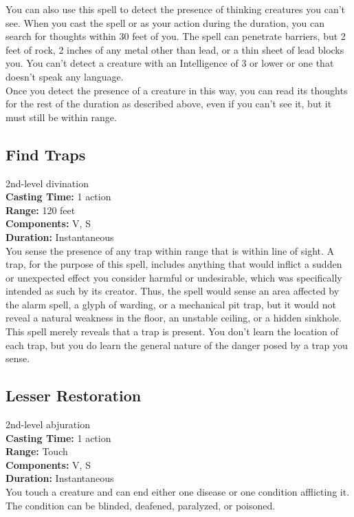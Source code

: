 \documentclass[11pt, A4paper, english]{article}
\begin{document}
You can also use this spell to detect the presence of thinking creatures you can't see. When you cast the spell or as your action during the duration, you can search for thoughts within 30 feet of you. The spell can penetrate barriers, but 2 feet of rock, 2 inches of any metal other than lead, or a thin sheet of lead blocks you. You can't detect a creature with an Intelligence of 3 or lower or one that doesn't speak any language. \\
Once you detect the presence of a creature in this way, you can read its thoughts for the rest of the duration as described above, even if you can't see it, but it must still be within range.

		\subsection{Find Traps}
2nd-level divination \\
\textbf{Casting Time:} 1 action \\
\textbf{Range:} 120 feet \\
\textbf{Components:} V, S \\
\textbf{Duration:} Instantaneous \\
You sense the presence of any trap within range that is within line of sight. A trap, for the purpose of this spell, includes anything that would inflict a sudden or unexpected effect you consider harmful or undesirable, which was specifically intended as such by its creator. Thus, the spell would sense an area affected by the alarm spell, a glyph of warding, or a mechanical pit trap, but it would not reveal a natural weakness in the floor, an unstable ceiling, or a hidden sinkhole. \\
This spell merely reveals that a trap is present. You don't learn the location of each trap, but you do learn the general nature of the danger posed by a trap you sense.

		\subsection{Lesser Restoration}
2nd-level abjuration \\
\textbf{Casting Time:} 1 action \\
\textbf{Range:} Touch \\
\textbf{Components:} V, S \\
\textbf{Duration:} Instantaneous \\
You touch a creature and can end either one disease or one condition afflicting it. The condition can be blinded, deafened, paralyzed, or poisoned.
\end{document}
